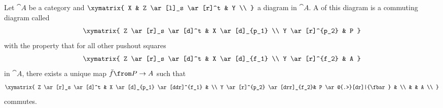 \begin{definition}[Pushout]
  \label{def:pushout}
  Let $\cat{A}$ be a category and
  $ \xymatrix{
    X & Z \ar[l]_s \ar[r]^t & Y \\
  } $
  a diagram in $\cat{A}$.
  A  of this diagram is a commuting diagram called  \\
  \[ \xymatrix{
    Z \ar[r]_s \ar[d]^t & X \ar[d]_{p_1} \\
    Y \ar[r]^{p_2} & P
  } \]
  with the property that for all other pushout squares
  \[ \xymatrix{
    Z \ar[r]_s \ar[d]^t & X \ar[d]_{f_1} \\
    Y \ar[r]^{f_2} & A
  } \]
  in $\cat{A}$, there exists a unique map $\fbar\from P \to A$ such that
  \[ \xymatrix{
    Z \ar[r]_s \ar[d]^t & X \ar[d]_{p_1} \ar[ddr]^{f_1} & \\
    Y \ar[r]^{p_2} \ar[drr]_{f_2}& P \ar@{.>}[dr]|{\fbar} & \\
    & & A  \\
  } \]
  commutes.
\end{definition}

